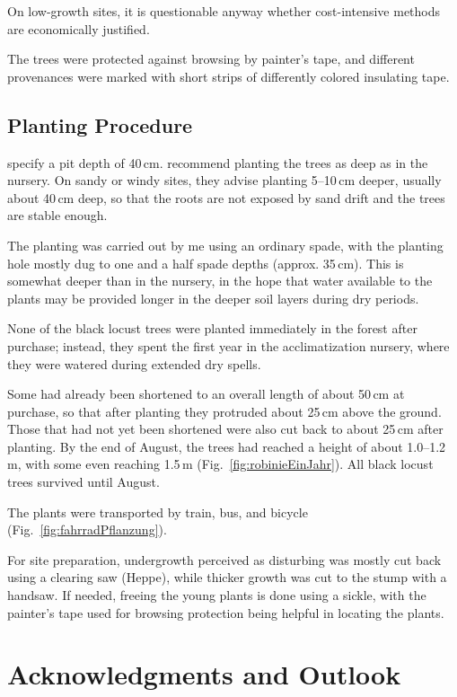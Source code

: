 On low-growth sites, it is questionable anyway whether cost-intensive methods are economically justified.

The trees were protected against browsing by painter’s tape, and different provenances were marked with short strips of differently colored insulating tape.

\subsection{Planting Procedure}

\citet{ciuvat2022robinieRumaenien} specify a pit depth of 40\,cm. \citet[pp.~164--165, 173]{vadas1911robinie} recommend planting the trees as deep as in the nursery. On sandy or windy sites, they advise planting 5--10\,cm deeper, usually about 40\,cm deep, so that the roots are not exposed by sand drift and the trees are stable enough.

The planting was carried out by me using an ordinary spade, with the planting hole mostly dug to one and a half spade depths (approx. 35\,cm). This is somewhat deeper than in the nursery, in the hope that water available to the plants may be provided longer in the deeper soil layers during dry periods.

None of the black locust trees were planted immediately in the forest after purchase; instead, they spent the first year in the acclimatization nursery, where they were watered during extended dry spells.

Some had already been shortened to an overall length of about 50\,cm at purchase, so that after planting they protruded about 25\,cm above the ground. Those that had not yet been shortened were also cut back to about 25\,cm after planting. By the end of August, the trees had reached a height of about 1.0--1.2\,m, with some even reaching 1.5\,m (Fig.~\ref{fig:robinieEinJahr}). All black locust trees survived until August.


The plants were transported by train, bus, and bicycle (Fig.~\ref{fig:fahrradPflanzung}).


For site preparation, undergrowth perceived as disturbing was mostly cut back using a clearing saw (Heppe), while thicker growth was cut to the stump with a handsaw. If needed, freeing the young plants is done using a sickle, with the painter’s tape used for browsing protection being helpful in locating the plants.

\section*{Acknowledgments and Outlook}

